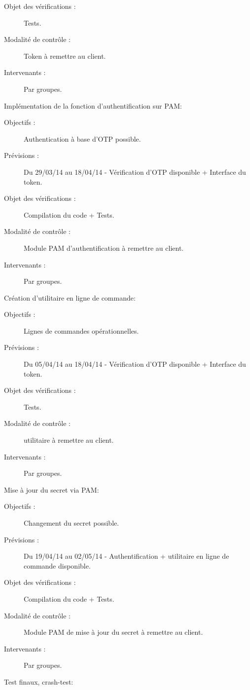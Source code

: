 \documentclass{../../res/univ-projet}
\begin{document}
\begin{description}
\begin{description}
		\item[Objet des vérifications :] Tests.
		\item[Modalité de contrôle :] Token à remettre au client.
		\item[Intervenants :] Par groupes.
	\end{description}
	\vfill
	\item Implémentation de la fonction d'authentification sur PAM:
	\begin{description}
		\item[Objectifs :] Authentication à base d'OTP possible.
		\item[Prévisions :] Du 29/03/14 au 18/04/14 - Vérification d'OTP disponible + Interface du token.
		\item[Objet des vérifications :] Compilation du code + Tests.
		\item[Modalité de contrôle :] Module PAM d'authentification à remettre au client.
		\item[Intervenants :] Par groupes.
	\end{description}
	\vfill
	\item Création d'utilitaire en ligne de commande:
	\begin{description}
		\item[Objectifs :] Lignes de commandes opérationnelles.
		\item[Prévisions :] Du 05/04/14 au 18/04/14 - Vérification d'OTP disponible + Interface du token.
		\item[Objet des vérifications :] Tests.
		\item[Modalité de contrôle :] utilitaire à remettre au client.
		\item[Intervenants :] Par groupes.
	\end{description}
	\vfill
	\item Mise à jour du secret via PAM:
	\begin{description}
		\item[Objectifs :] Changement du secret possible.
		\item[Prévisions :] Du 19/04/14 au 02/05/14 - Authentification + utilitaire en ligne de commande disponible.
		\item[Objet des vérifications :] Compilation du code + Tests.
		\item[Modalité de contrôle :] Module PAM de mise à jour du secret à remettre au client.
		\item[Intervenants :] Par groupes.
	\end{description}
	\vfill
	\item Test finaux, crash-test:

\end{description}
\end{document}
